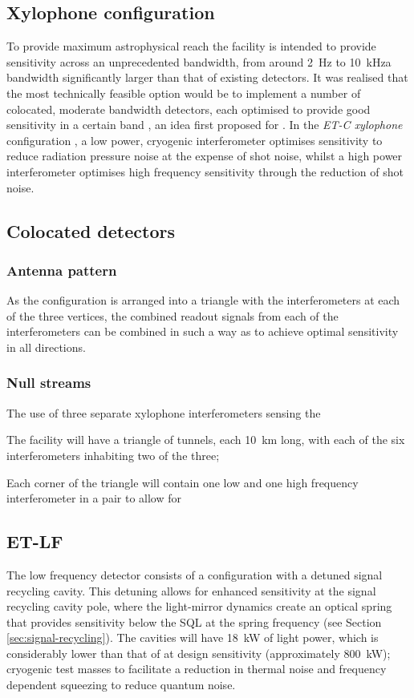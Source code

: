 \subsection{Xylophone configuration}
To provide maximum astrophysical reach the facility is intended to provide sensitivity across an unprecedented bandwidth, from around \SI{2}{\hertz} to \SI{10}{\kilo\hertz}\textemdash a bandwidth significantly larger than that of existing detectors. It was realised that the most technically feasible option would be to implement a number of colocated, moderate bandwidth detectors, each optimised to provide good sensitivity in a certain band \cite{Hild2010}, an idea first proposed for \ALIGO{} \cite{Conforto2004}. In the \emph{ET-C xylophone} configuration \cite{Hild2010}, a low power, cryogenic interferometer optimises sensitivity to reduce radiation pressure noise at the expense of shot noise, whilst a high power interferometer optimises high frequency sensitivity through the reduction of shot noise.

\subsection{Colocated detectors}

\subsubsection{Antenna pattern}
As the configuration is arranged into a triangle with the interferometers at each of the three vertices, the combined readout signals from each of the interferometers can be combined in such a way as to achieve optimal sensitivity in all directions.

\subsubsection{Null streams}
The use of three separate xylophone interferometers sensing the

The facility will have a triangle of tunnels, each \SI{10}{\kilo\meter} long, with each of the six interferometers inhabiting two of the three;

Each corner of the triangle will contain one low and one high frequency interferometer in a pair to allow for 


\subsection{ET-LF}
The low frequency detector consists of a \DRFPMI{} configuration with a detuned signal recycling cavity. This detuning allows for enhanced sensitivity at the signal recycling cavity pole, where the light-mirror dynamics create an optical spring that provides sensitivity below the \gls{SQL} at the spring frequency (see Section\,\ref{sec:signal-recycling}). The cavities will have \SI{18}{\kilo\watt} of light power, which is considerably lower than that of \ALIGO{} at design sensitivity (approximately \SI{800}{\kilo\watt}); cryogenic test masses to facilitate a reduction in thermal noise and frequency dependent squeezing to reduce quantum noise.

